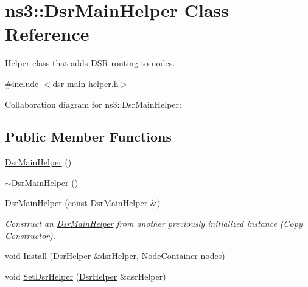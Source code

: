 \hypertarget{classns3_1_1DsrMainHelper}{}\section{ns3\+:\+:Dsr\+Main\+Helper Class Reference}
\label{classns3_1_1DsrMainHelper}


Helper class that adds D\+SR routing to nodes.  




{\ttfamily \#include $<$dsr-\/main-\/helper.\+h$>$}



Collaboration diagram for ns3\+:\+:Dsr\+Main\+Helper\+:
\subsection*{Public Member Functions}
\begin{DoxyCompactItemize}
\item 
\hyperlink{classns3_1_1DsrMainHelper_acc4e556b5fc956a3c044173f9b713d7c}{Dsr\+Main\+Helper} ()
\item 
\hyperlink{classns3_1_1DsrMainHelper_afb83ab4f1c26430c1f135ba117e14790}{$\sim$\+Dsr\+Main\+Helper} ()
\item 
\hyperlink{classns3_1_1DsrMainHelper_ab58e14fb67ad92ce5177cc3ade6e18cf}{Dsr\+Main\+Helper} (const \hyperlink{classns3_1_1DsrMainHelper}{Dsr\+Main\+Helper} \&)
\begin{DoxyCompactList}\small\item\em Construct an \hyperlink{classns3_1_1DsrMainHelper}{Dsr\+Main\+Helper} from another previously initialized instance (Copy Constructor). \end{DoxyCompactList}\item 
void \hyperlink{classns3_1_1DsrMainHelper_a408d7c024fb51bc54012b6f728a7fec4}{Install} (\hyperlink{classns3_1_1DsrHelper}{Dsr\+Helper} \&dsr\+Helper, \hyperlink{classns3_1_1NodeContainer}{Node\+Container} \hyperlink{visualizer-ideas_8txt_a3e1b3808014a2c68ab0cd0182e041be2}{nodes})
\item 
void \hyperlink{classns3_1_1DsrMainHelper_a8e14afc4502bc21e852c076ddb113a8b}{Set\+Dsr\+Helper} (\hyperlink{classns3_1_1DsrHelper}{Dsr\+Helper} \&dsr\+Helper)
\end{DoxyCompactItemize}
